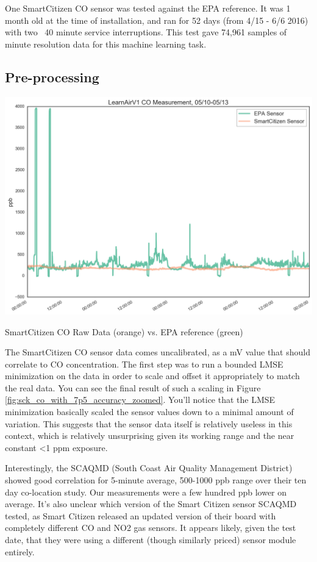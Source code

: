 One SmartCitizen CO sensor was tested against the EPA reference.  It was 1 month old at the time of installation, and ran for 52 days (from 4/15 - 6/6 2016) with two ~40 minute service interruptions.  This test gave 74,961 samples of minute resolution data for this machine learning task.


\subsection{Pre-processing}

\begin{marginfigure}
 	\includegraphics[width=\textwidth]{figs/co_sck_zoomed}               
 	 \caption{SmartCitizen CO Raw Data (orange) vs. EPA reference (green)}
  	\label{fig:sck_co_raw_zoomed}
\end{marginfigure}

The SmartCitizen CO sensor data comes uncalibrated, as a mV value that should correlate to CO concentration.  The first step was to run a bounded LMSE minimization on the data in order to scale and offset it appropriately to match the real data.  You can see the final result of such a scaling in Figure \ref{fig:sck_co_with_7p5_accuracy_zoomed}.  You'll notice that the LMSE minimization basically scaled the sensor values down to a minimal amount of variation.  This suggests that the sensor data itself is relatively useless in this context, which is relatively unsurprising given its working range and the near constant <1 ppm exposure.  

Interestingly, the SCAQMD (South Coast Air Quality Management District) showed good correlation for 5-minute average, 500-1000 ppb range over their ten day co-location study.  Our measurements were a few hundred ppb lower on average.  It's also unclear which version of the Smart Citizen sensor SCAQMD tested, as Smart Citizen released an updated version of their board with completely different CO and NO2 gas sensors.  It appears likely, given the test date, that they were using a different (though similarly priced) sensor module entirely.


